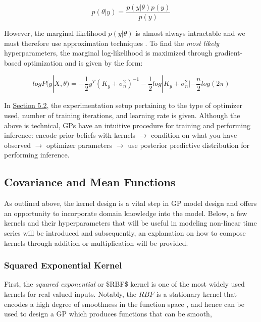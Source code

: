 \begin{equation}
p(\theta | y) = \frac{p(y | \theta)p(y)}{p(y)}
\end{equation}

However, the marginal likelihood $p(y | \theta)$ is almost always intractable and we must therefore use approximation techniques \cite{pml1Book}. To find the \textit{most likely} hyperparameters, the marginal log-likelihood is maximized through gradient-based optimization and is given by the form:

\begin{equation}
log P(y | X, \theta) = -\frac{1}{2}y^T(K_{y} + \sigma_{n}^2)^{-1} - \frac{1}{2}log|K_{y} + \sigma_{n}^2| - \frac{n}{2} log(2\pi)
\end{equation}

In \hyperlink{subsection.5.2}{Section 5.2}, the experimentation setup pertaining to the type of optimizer used, number of training iterations, and learning rate is given. Although the above is technical, GPs have an intuitive procedure for training and performing inference: encode prior beliefs with kernels $\rightarrow$ condition on what you have observed $\rightarrow$ optimizer parameters $\rightarrow$ use posterior predictive distribution for performing inference.

\subsection{Covariance and Mean Functions}

As outlined above, the kernel design is a vital step in GP model design and offers an opportunity to incorporate domain knowledge into the model. Below, a few kernels and their hyperparameters that will be useful in modeling non-linear time series will be introduced and subsequently, an explanation on how to compose kernels through addition or multiplication will be provided.

\subsubsection{Squared Exponential Kernel}

First, the \textit{squared exponential} or \ac{$RBF$} kernel is one of the most widely used kernels for real-valued inputs. Notably, the $RBF$ is a stationary kernel that encodes a high degree of smoothness in the function space \cite{pml1Book}, and hence can be used to design a GP which produces functions that can be smooth,

